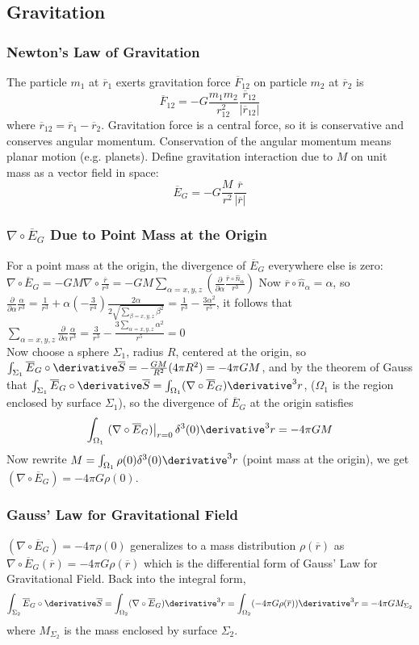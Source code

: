 \subsection{Gravitation}
\begin{frame}
\frametitle{Newton's Law of Gravitation}
The particle $m_1$ at $\overline r_1$ exerts gravitation force $\overline F_{12}$ on particle $m_2$ at $\overline r_2$ is 
\[\overline F_{12}=-G\frac{m_1m_2}{r_{12}^2}\frac{\overline r_{12}}{|\overline r_{12}|}\]
where $\overline r_{12}=\overline r_1-\overline r_2$. Gravitation force is a  \alert{central} force, so it is \alert{conservative} and conserves \alert{angular momentum}. Conservation of the angular momentum means \alert{planar} motion (e.g. planets). Define gravitation interaction due to $M$ on unit mass as a vector field in space:
\[\overline E_G=-G\frac{M}{r^2}\frac{\overline r}{|\overline r|}\]
\end{frame}
\begin{frame}
\frametitle{$\nabla\circ \overline E_G$ Due to Point Mass at the Origin}
For a point mass at the origin, the divergence of $\overline E_G$ everywhere else is zero:
$\nabla\circ\overline E_G=-GM\nabla\circ\frac{\overline r}{r^3}=-GM\sum_{\alpha=x,y,z}\left(\frac{\partial}{\partial \alpha}\frac{\overline r\circ\hat n_{\alpha}}{r^3}\right)$
Now $\overline r\circ\hat n_\alpha=\alpha$, so $\frac{\partial}{\partial\alpha}\frac{\alpha}{r^3}=\frac{1}{r^3}+\alpha\left(-\frac{3}{r^4}\right)\frac{2\alpha}{2\sqrt{\sum_{\beta=x,y,z}\beta^2}}=\frac{1}{r^3}-\frac{3\alpha^2}{r^5}$, it follows that $\sum_{\alpha=x,y,z}\frac{\partial}{\partial\alpha}\frac{\alpha}{r^3}=\frac{3}{r^3}-\frac{3\sum_{\alpha=x,y,z}\alpha^2}{r^5}=0$\\
Now choose a sphere $\Sigma_1$, radius $R$, centered at the origin, so $\int_{\Sigma_{1}}\overline E_G\circ \derivative \overline S=-\frac{GM}{R^2}(4\pi R^2)=-4\pi GM$, and by the theorem of Gauss that $\int_{\Sigma_1}\overline E_G\circ\derivative\overline S=\int_{\Omega_1}(\nabla\circ\overline{E}_G)\derivative^3 r$, ($\Omega_1$ is the region enclosed by surface $\Sigma_1$), so the divergence of $\overline E_G$ at the origin satisfies
\[\int_{\Omega_1}\left.(\nabla\circ\overline{E}_G)\right|_{r=0}\delta^3(0)\derivative^3 r=-4\pi GM\]
Now rewrite $M=\int_{\Omega_1}\rho(0)\delta^3(0)\derivative^3 r$ (point mass at the origin), we get $\left(\nabla\circ\overline{E}_G\right)=-4\pi G\rho(0)$.
\end{frame}
\begin{frame}
\frametitle{Gauss' Law for Gravitational Field}
$\left(\nabla\circ\overline{E}_G\right)=-4\pi\rho(0)$ generalizes to a mass distribution $\rho(\overline r)$ as $\nabla\circ\overline E_G(\overline r)=-4\pi G\rho(\overline r)$ which is the differential form of Gauss' Law for Gravitational Field. Back into the integral form,
\[\int_{\Sigma_2}\overline E_G\circ\derivative\overline S=\int_{\Omega_2}(\nabla\circ \overline E_G)\derivative^3 r=\int_{\Omega_2}(-4\pi G\rho(\overline r))\derivative^3 r=-4\pi G M_{\Sigma_2}\]where $M_{\Sigma_2}$ is the mass enclosed by surface $\Sigma_2$.
\end{frame}
